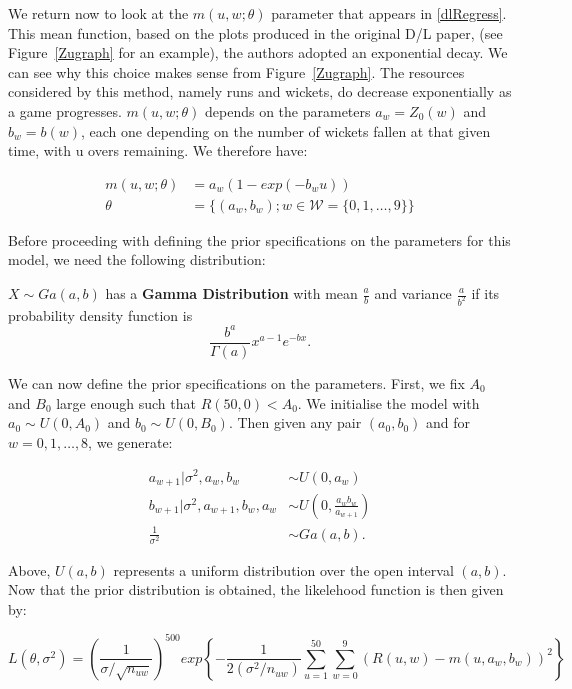 We return now to look at the $m(u,w;\theta)$ parameter that appears in \ref{dlRegress}. This mean function, based on the plots produced in the original D/L
paper, (see Figure~\ref{Zugraph} for an example), the authors adopted an exponential decay. We can see why this choice makes sense from Figure~\ref{Zugraph}.
The resources considered by this method, namely runs and wickets, do decrease exponentially as a game progresses. $m(u,w;\theta)$ depends on the parameters
$a_w = Z_0(w)$ and $b_w = b(w)$, each one depending on the number of wickets fallen at that given time, with u overs remaining. We therefore have:

\begin{align}
    \label{mdef}
        m(u,w;\theta) &= a_w(1-exp(-b_wu)) \\
               \theta &= \{ (a_w,b_w); w \in \mathcal{W}=\{0,1,\ldots,9\} \} 
\end{align}

Before proceeding with defining the prior specifications on the parameters for this model, we need the following distribution:

\begin{definition}
    $X \sim Ga(a,b)$ has a \textbf{Gamma Distribution} with mean $\frac{a}{b}$ and variance $\frac{a}{b^2}$ if its probability density function is
    $$
        \frac{b^a}{\Gamma(a)} x^{a-1}e^{-bx}.  
    $$
\end{definition}

We can now define the prior specifications on the parameters. First, we fix $A_0$ and $B_0$ large enough such that $R(50,0) < A_0$. We initialise  the model with
$a_0 \sim U(0,A_0)$ and $b_0 \sim U(0,B_0)$. Then given any pair $(a_0,b_0)$ and for $w=0,1,\ldots,8$, we generate:

\begin{align}
    a_{w+1}|\sigma^2,a_w,b_w &\sim U(0,a_w) \\
    b_{w+1}|\sigma^2,a_{w+1},b_w,a_w &\sim U\left(0,\frac{a_wb_w}{a_{w+1}}\right) \\
    \frac{1}{\sigma^2} &\sim Ga(a,b).
\end{align}

Above, $U(a,b)$ represents a uniform distribution over the open interval $(a,b)$. Now that the prior distribution is obtained, the likelehood function is then 
given by:

\begin{equation}
    L(\theta,\sigma^2) = \left( \frac{1}{\sigma / \sqrt{n_{uw}}} \right)^{500} exp \left\{ - \frac{1}{2(\sigma^2 / n_{uw})} \sum_{u=1}^{50} \sum_{w=0}^9 (R(u,w)-m(u,a_w,b_w))^2  \right\}
\end{equation}

